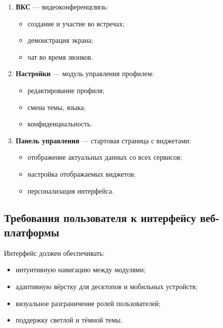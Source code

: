 \begin{enumerate}
  \item \textbf{ВКС} — видеоконференцсвязь:
  \begin{itemize}
    \item создание и участие во встречах;
    \item демонстрация экрана;
    \item чат во время звонков.
  \end{itemize}

  \item \textbf{Настройки} — модуль управления профилем:
  \begin{itemize}
    \item редактирование профиля;
    \item смена темы, языка;
    \item конфиденциальность.
  \end{itemize}

  \item \textbf{Панель управления} — стартовая страница с виджетами:
  \begin{itemize}
    \item отображение актуальных данных со всех сервисов;
    \item настройка отображаемых виджетов;
    \item персонализация интерфейса.
  \end{itemize}
\end{enumerate}

\subsection{Требования пользователя к интерфейсу веб-платформы}

Интерфейс должен обеспечивать:
\begin{itemize}
  \item интуитивную навигацию между модулями;
  \item адаптивную вёрстку для десктопов и мобильных устройств;
  \item визуальное разграничение ролей пользователей;
  \item поддержку светлой и тёмной темы.
\end{itemize}

